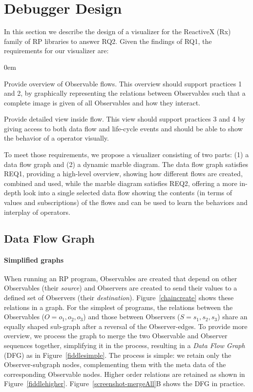 \section{Debugger Design}
\label{section-design}
In this section we describe the design of a visualizer for the ReactiveX (Rx) family of RP libraries to answer RQ2. Given the findings of RQ1, the requirements for our visualizer are:
\begin{description}
\itemsep0em 
\item[REQ1] Provide overview of Observable flows. This overview should support practices 1 and 2, by graphically representing the relations between Observables such that a complete image is given of all Observables and how they interact. 
\item[REQ2] Provide detailed view inside flow. This view should support practices 3 and 4 by giving access to both data flow and life-cycle events and should be able to show the behavior of a operator visually.
\end{description}

To meet those requirements, we propose a visualizer consisting of two parts: (1) a data flow graph and (2) a dynamic marble diagram. The data flow graph satisfies REQ1, providing a high-level overview, showing how different flows are created, combined and used, while the marble diagram satisfies REQ2, offering a more in-depth look into a single selected data flow showing the contents (in terms of values and subscriptions) of the flows and can be used to learn the behaviors and interplay of operators.

\subsection{Data Flow Graph}
\paragraph{Simplified graphs} When running an RP program, Observables are created that depend on other Observables (their \emph{source}) and Observers are created to send their values to a defined set of Observers (their \emph{destination}). Figure~\ref{chaincreate} shows these relations in a graph. For the simplest of programs, the relations between the Observables ($O = {o_1, o_2, o_3}$) and those between Observers ($S = {s_1, s_2, s_3}$) share an equally shaped sub-graph after a reversal of the Observer-edges. To provide more overview, we process the graph to merge the two Observable and Observer sequences together, simplifying it in the process, resulting in a \emph{Data Flow Graph} (DFG) as in Figure~\ref{fiddlesimple}. The process is simple: we retain only the Observer-subgraph nodes, complementing them with the meta data of the corresponding Observable nodes. Higher order relations are retained as shown in Figure~\ref{fiddlehigher}. Figure~\ref{screenshot-mergeAll}B shows the DFG in practice.

